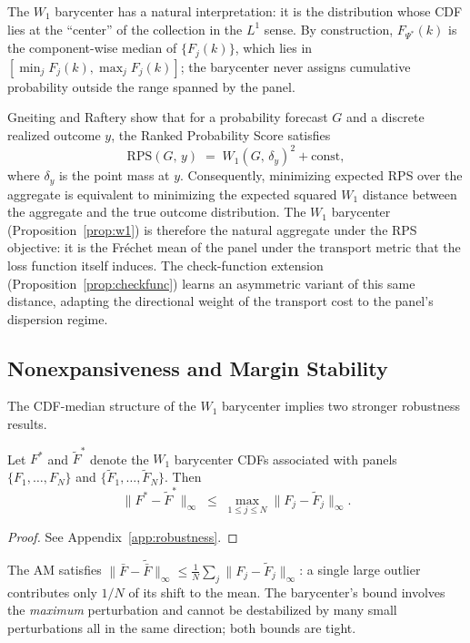 The $W_1$ barycenter has a natural interpretation: it is the distribution whose CDF lies at the ``center'' of the collection in the $L^1$ sense.  By construction, $F_{\Psi^*}(k)$ is the component-wise median of $\{F_j(k)\}$, which lies in $[\min_j F_j(k), \max_j F_j(k)]$; the barycenter never assigns cumulative probability outside the range spanned by the panel.

\begin{remark}
\label{rem:rps_w1}
Gneiting and Raftery \cite{gneiting07} show that for a probability forecast $G$ and a
discrete realized outcome $y$, the Ranked Probability Score satisfies
\[
  \mathrm{RPS}(G,\, y) \;=\; W_1(G,\,\delta_y)^2 + \text{const},
\]
where $\delta_y$ is the point mass at $y$.
Consequently, minimizing expected RPS over the aggregate is equivalent to minimizing the
expected squared $W_1$ distance between the aggregate and the true outcome distribution.
The $W_1$ barycenter (Proposition~\ref{prop:w1}) is therefore the natural aggregate under
the RPS objective: it is the Fr\'echet mean of the panel under the transport metric that
the loss function itself induces.
The check-function extension (Proposition~\ref{prop:checkfunc}) learns an asymmetric
variant of this same distance, adapting the directional weight of the transport cost to
the panel's dispersion regime.
\end{remark}

\subsection{Nonexpansiveness and Margin Stability}
\label{sec:nonexpansive}

The CDF-median structure of the $W_1$ barycenter implies two stronger robustness results.

\begin{proposition}
\label{prop:nonexpansive}
Let $F^*$ and $\tilde F^*$ denote the $W_1$ barycenter CDFs associated with panels $\{F_1,\ldots,F_N\}$ and $\{\tilde F_1,\ldots,\tilde F_N\}$.  Then
\[
  \|F^* - \tilde F^*\|_\infty \;\leq\; \max_{1\leq j\leq N}\|F_j - \tilde F_j\|_\infty.
\]
\end{proposition}
\begin{proof}
See Appendix~\ref{app:robustness}.
\end{proof}

\begin{remark}
The AM satisfies $\|\bar F - \tilde{\bar F}\|_\infty \leq \frac{1}{N}\sum_j\|F_j-\tilde F_j\|_\infty$: a single large outlier contributes only $1/N$ of its shift to the mean.  The barycenter's bound involves the \emph{maximum} perturbation and cannot be destabilized by many small perturbations all in the same direction; both bounds are tight.
\end{remark}

